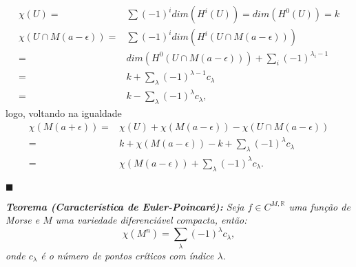 \documentclass{article}
\begin{document}
	$$
	\begin{aligned}
	\chi(U) =& \sum (-1)^{i}dim(H^{i}(U)) = dim(H^{0}(U)) = k
	\\
	\chi(U \cap M(a-\epsilon)) =& \sum (-1)^{i}dim(H^{i}(U \cap M(a-\epsilon))) 
	\\
	=& dim(H^{0}(U \cap M(a-\epsilon))) + \sum_{i}(-1)^{\lambda_{i} - 1} 
	\\
	=& k + \sum_{\lambda}(-1)^{\lambda - 1}c_{\lambda} 
	\\
	=& k - \sum_{\lambda}(-1)^{\lambda}c_{\lambda},
	\end{aligned}
	$$
	logo, voltando na igualdade 
	$$
	\begin{aligned}
	\chi(M(a+\epsilon)) =& \chi(U) + \chi(M(a-\epsilon)) - \chi(U \cap M(a-\epsilon))
	\\
	=& k +\chi(M(a-\epsilon)) - k + \sum_{\lambda}(-1)^{\lambda}c_{\lambda}
	\\
	=& \chi(M(a-\epsilon)) + \sum_{\lambda}(-1)^{\lambda}c_{\lambda}.
	\end{aligned}
	$$
	
	$\blacksquare$
	
	\vspace{2mm}
	\textit{\textbf{Teorema (Característica de Euler-Poincaré):} Seja $f \in C^{M, \mathbb{R}}$ uma função de Morse e $M$ uma variedade diferenciável compacta, então:
	$$
	\chi(M^{n}) = \sum_{\lambda}(-1)^{\lambda}c_{\lambda},
	$$
	onde $c_{\lambda}$ é o número de pontos críticos com índice $\lambda$.}
	
\end{document}
